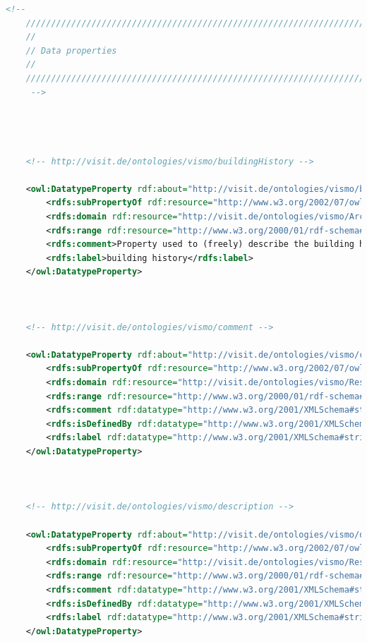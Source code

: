 \begin{lstlisting}[caption={VisMo Ontologie in der letzten (englischen) Version.},label={lst:vismo},captionpos=b,language=xml]
    <!-- 
    ///////////////////////////////////////////////////////////////////////////////////////
    //
    // Data properties
    //
    ///////////////////////////////////////////////////////////////////////////////////////
     -->

    


    <!-- http://visit.de/ontologies/vismo/buildingHistory -->

    <owl:DatatypeProperty rdf:about="http://visit.de/ontologies/vismo/buildingHistory">
        <rdfs:subPropertyOf rdf:resource="http://www.w3.org/2002/07/owl#topDataProperty"/>
        <rdfs:domain rdf:resource="http://visit.de/ontologies/vismo/Architecture"/>
        <rdfs:range rdf:resource="http://www.w3.org/2000/01/rdf-schema#Literal"/>
        <rdfs:comment>Property used to (freely) describe the building history of a vismo:Architecture entity.</rdfs:comment>
        <rdfs:label>building history</rdfs:label>
    </owl:DatatypeProperty>
    


    <!-- http://visit.de/ontologies/vismo/comment -->

    <owl:DatatypeProperty rdf:about="http://visit.de/ontologies/vismo/comment">
        <rdfs:subPropertyOf rdf:resource="http://www.w3.org/2002/07/owl#topDataProperty"/>
        <rdfs:domain rdf:resource="http://visit.de/ontologies/vismo/Resource"/>
        <rdfs:range rdf:resource="http://www.w3.org/2000/01/rdf-schema#Literal"/>
        <rdfs:comment rdf:datatype="http://www.w3.org/2001/XMLSchema#string">This is a comment about a given vismo entity.</rdfs:comment>
        <rdfs:isDefinedBy rdf:datatype="http://www.w3.org/2001/XMLSchema#string">http://visit.de/ontologies/vismo</rdfs:isDefinedBy>
        <rdfs:label rdf:datatype="http://www.w3.org/2001/XMLSchema#string">comment</rdfs:label>
    </owl:DatatypeProperty>
    


    <!-- http://visit.de/ontologies/vismo/description -->

    <owl:DatatypeProperty rdf:about="http://visit.de/ontologies/vismo/description">
        <rdfs:subPropertyOf rdf:resource="http://www.w3.org/2002/07/owl#topDataProperty"/>
        <rdfs:domain rdf:resource="http://visit.de/ontologies/vismo/Resource"/>
        <rdfs:range rdf:resource="http://www.w3.org/2000/01/rdf-schema#Literal"/>
        <rdfs:comment rdf:datatype="http://www.w3.org/2001/XMLSchema#string">This property defines a (historical) description for a vismo entity.</rdfs:comment>
        <rdfs:isDefinedBy rdf:datatype="http://www.w3.org/2001/XMLSchema#string">http://visit.de/ontologies/vismo/</rdfs:isDefinedBy>
        <rdfs:label rdf:datatype="http://www.w3.org/2001/XMLSchema#string">description</rdfs:label>
    </owl:DatatypeProperty>
    



\end{lstlisting}
